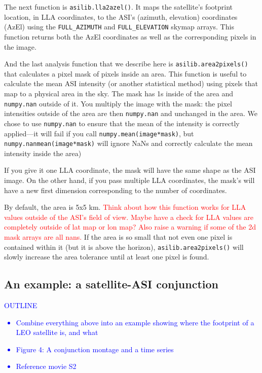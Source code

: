\documentclass[draft]{agujournal2019}
\begin{document}
The next function is \verb|asilib.lla2azel()|. It maps the satellite's footprint location, in LLA coordinates, to the ASI's (azimuth, elevation) coordinates (AzEl) using the \verb|FULL_AZIMUTH| and \verb|FULL_ELEVATION| skymap arrays. This function returns both the AzEl coordinates as well as the corresponding pixels in the image.

And the last analysis function that we describe here is \verb|asilib.area2pixels()| that calculates a pixel mask of pixels inside an area. This function is useful to calculate the mean ASI intensity (or another statistical method) using pixels that map to a physical area in the sky. The mask has 1s inside of the area and \verb|numpy.nan| outside of it. You multiply the image with the mask: the pixel intensities outside of the area are then \verb|numpy.nan| and unchanged in the area. We chose to use \verb|numpy.nan| to ensure that the mean of the intensity is correctly applied---it will fail if you call \verb|numpy.mean(image*mask)|, but \verb|numpy.nanmean(image*mask)| will ignore NaNs and correctly calculate the mean intensity inside the area)

If you give it one LLA coordinate, the mask will have the same shape as the ASI image. On the other hand, if you pass multiple LLA coordinates, the mask's will have a new first dimension corresponding to the number of coordinates.

By default, the area is 5x5 km. \textcolor{red}{Think about how this function works for LLA values outside of the ASI's field of view. Maybe have a check for LLA values are completely outside of lat map or lon map? Also raise a warning if some of the 2d mask arrays are all nans.} If the area is so small that not even one pixel is contained within it (but it is above the horizon), \verb|asilib.area2pixels()| will slowly increase the area tolerance until at least one pixel is found.

\subsection{An example: a satellite-ASI conjunction}\label{satellite_conjunction}
\textcolor{blue}{
      OUTLINE
      \begin{itemize}
            \item Combine everything above into an example showing where the footprint of a LEO satellite is, and what 
            \item Figure 4: A conjunction montage and a time series
            \item Reference movie S2
      \end{itemize}
}
\end{document}
